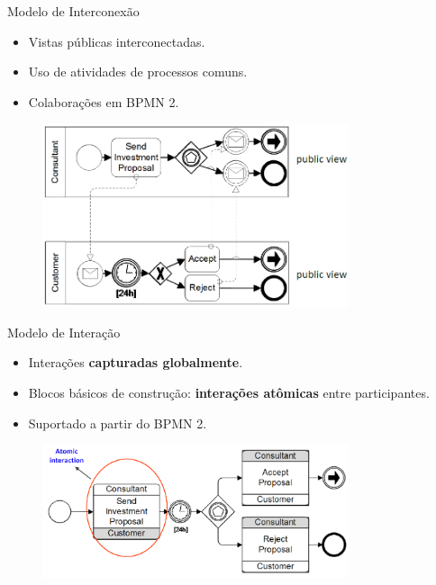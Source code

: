 \documentclass[xcolor=svgnames]{beamer}
\begin{document}
  \begin{frame}{Modelo de Interconexão }
      \begin{itemize}
	\item Vistas públicas interconectadas.	
	\item Uso de atividades de processos comuns.
 	\item Colaborações em BPMN 2.
      \end{itemize}
   \begin{figure}[!h]
	    \centering
	    \includegraphics[width=0.8\textwidth]{figures/interconnection_choreography.png}
    \end{figure}	
  \end{frame}

  \begin{frame}{ Modelo de Interação}
    \begin{itemize}
	  \item Interações \textbf{capturadas globalmente}.	
	  \item Blocos básicos de construção: \textbf{interações atômicas} entre participantes.
	  \item Suportado a partir do BPMN 2.
	\end{itemize}
    \begin{figure}[!h]
	      \centering
	      \includegraphics[width=0.8\textwidth]{figures/interaction_choreography2.png}
      \end{figure}	
  \end{frame}
\end{document}
